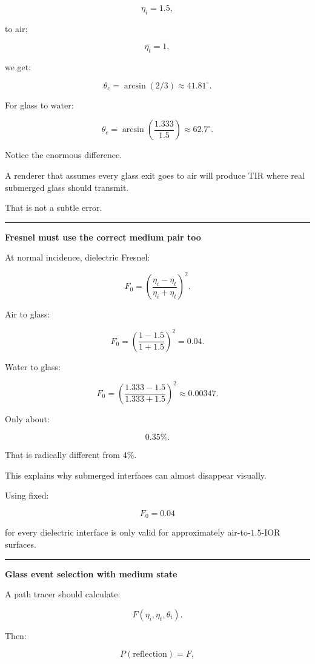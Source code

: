 \[
\eta_i=1.5,
\]

to air:

\[
\eta_t=1,
\]

we get:

\[
\theta_c
=
\arcsin(2/3)
\approx41.81^\circ.
\]

For glass to water:

\[
\theta_c
=
\arcsin
\left(
\frac{1.333}{1.5}
\right)
\approx62.7^\circ.
\]

Notice the enormous difference.

A renderer that assumes every glass exit goes to air will produce TIR where real submerged glass should transmit.

That is not a subtle error.

\begin{center}\rule{0.5\linewidth}{0.5pt}\end{center}

\textbf{Fresnel must use the correct medium pair too}

At normal incidence, dielectric Fresnel:

\[
\boxed{
F_0
=
\left(
\frac{
\eta_i-\eta_t
}{
\eta_i+\eta_t
}
\right)^2.
}
\]

Air to glass:

\[
F_0
=
\left(
\frac{1-1.5}{1+1.5}
\right)^2
=
0.04.
\]

Water to glass:

\[
F_0
=
\left(
\frac{1.333-1.5}{1.333+1.5}
\right)^2
\approx0.00347.
\]

Only about:

\[
0.35\%.
\]

That is radically different from 4\%.

This explains why submerged interfaces can almost disappear visually.

Using fixed:

\[
F_0=0.04
\]

for every dielectric interface is only valid for approximately air-to-\(1.5\)-IOR surfaces.

\begin{center}\rule{0.5\linewidth}{0.5pt}\end{center}

\textbf{Glass event selection with medium state}

A path tracer should calculate:

\[
F(\eta_i,\eta_t,\theta_i).
\]

Then:

\[
P(\text{reflection})=F,
\]

